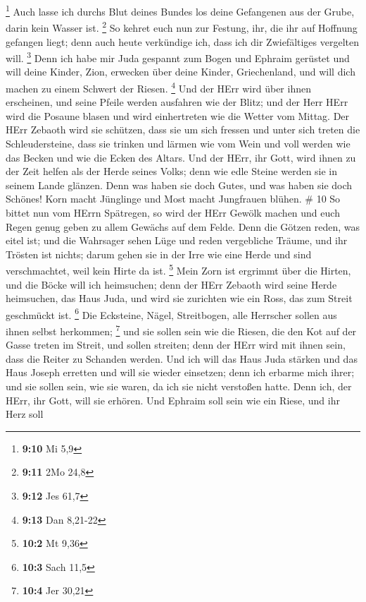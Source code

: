 \footnote{\textbf{9:10} Mi 5,9}  Auch lasse ich durchs Blut
deines Bundes los deine Gefangenen aus der Grube, darin kein Wasser ist.
\footnote{\textbf{9:11} 2Mo 24,8}  So kehret euch nun zur
Festung, ihr, die ihr auf Hoffnung gefangen liegt; denn auch heute
verkündige ich, dass ich dir Zwiefältiges vergelten will. \footnote{\textbf{9:12}
  Jes 61,7}  Denn ich habe mir Juda gespannt zum Bogen und
Ephraim gerüstet und will deine Kinder, Zion, erwecken über deine
Kinder, Griechenland, und will dich machen zu einem Schwert der Riesen.
\footnote{\textbf{9:13} Dan 8,21-22}  Und der HErr wird
über ihnen erscheinen, und seine Pfeile werden ausfahren wie der Blitz;
und der Herr HErr wird die Posaune blasen und wird einhertreten wie die
Wetter vom Mittag.  Der HErr Zebaoth wird sie schützen,
dass sie um sich fressen und unter sich treten die Schleudersteine, dass
sie trinken und lärmen wie vom Wein und voll werden wie das Becken und
wie die Ecken des Altars.  Und der HErr, ihr Gott, wird
ihnen zu der Zeit helfen als der Herde seines Volks; denn wie edle
Steine werden sie in seinem Lande glänzen.  Denn was haben
sie doch Gutes, und was haben sie doch Schönes! Korn macht Jünglinge und
Most macht Jungfrauen blühen. \# 10  So bittet nun vom HErrn
Spätregen, so wird der HErr Gewölk machen und euch Regen genug geben zu
allem Gewächs auf dem Felde.  Denn die Götzen reden, was
eitel ist; und die Wahrsager sehen Lüge und reden vergebliche Träume,
und ihr Trösten ist nichts; darum gehen sie in der Irre wie eine Herde
und sind verschmachtet, weil kein Hirte da ist. \footnote{\textbf{10:2}
  Mt 9,36}  Mein Zorn ist ergrimmt über die Hirten, und die
Böcke will ich heimsuchen; denn der HErr Zebaoth wird seine Herde
heimsuchen, das Haus Juda, und wird sie zurichten wie ein Ross, das zum
Streit geschmückt ist. \footnote{\textbf{10:3} Sach 11,5} 
Die Ecksteine, Nägel, Streitbogen, alle Herrscher sollen aus ihnen
selbst herkommen; \footnote{\textbf{10:4} Jer 30,21}  und
sie sollen sein wie die Riesen, die den Kot auf der Gasse treten im
Streit, und sollen streiten; denn der HErr wird mit ihnen sein, dass die
Reiter zu Schanden werden.  Und ich will das Haus Juda
stärken und das Haus Joseph erretten und will sie wieder einsetzen; denn
ich erbarme mich ihrer; und sie sollen sein, wie sie waren, da ich sie
nicht verstoßen hatte. Denn ich, der HErr, ihr Gott, will sie erhören.
 Und Ephraim soll sein wie ein Riese, und ihr Herz soll
